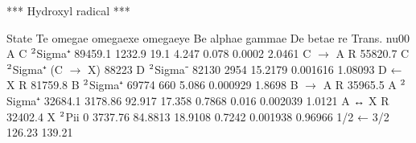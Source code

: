 \documentclass[letterpaper,10pt,english]{sphinxmanual}
\begin{document}
\begin{sphinxVerbatim}[commandchars=\\\{\}]
*** Hydroxyl radical ***

State          T\PYGZus{}e    omega\PYGZus{}e    omega\PYGZus{}ex\PYGZus{}e  omega\PYGZus{}ey\PYGZus{}e        B\PYGZus{}e    alpha\PYGZus{}e    gamma\PYGZus{}e       D\PYGZus{}e  beta\PYGZus{}e        r\PYGZus{}e  Trans.        nu\PYGZus{}00        A
\PYGZhy{}\PYGZhy{}\PYGZhy{}\PYGZhy{}\PYGZhy{}\PYGZhy{}\PYGZhy{}\PYGZhy{}\PYGZhy{}  \PYGZhy{}\PYGZhy{}\PYGZhy{}\PYGZhy{}\PYGZhy{}\PYGZhy{}\PYGZhy{}  \PYGZhy{}\PYGZhy{}\PYGZhy{}\PYGZhy{}\PYGZhy{}\PYGZhy{}\PYGZhy{}\PYGZhy{}\PYGZhy{}  \PYGZhy{}\PYGZhy{}\PYGZhy{}\PYGZhy{}\PYGZhy{}\PYGZhy{}\PYGZhy{}\PYGZhy{}\PYGZhy{}\PYGZhy{}\PYGZhy{}\PYGZhy{}  \PYGZhy{}\PYGZhy{}\PYGZhy{}\PYGZhy{}\PYGZhy{}\PYGZhy{}\PYGZhy{}\PYGZhy{}\PYGZhy{}\PYGZhy{}\PYGZhy{}\PYGZhy{}  \PYGZhy{}\PYGZhy{}\PYGZhy{}\PYGZhy{}\PYGZhy{}\PYGZhy{}\PYGZhy{}  \PYGZhy{}\PYGZhy{}\PYGZhy{}\PYGZhy{}\PYGZhy{}\PYGZhy{}\PYGZhy{}\PYGZhy{}\PYGZhy{}  \PYGZhy{}\PYGZhy{}\PYGZhy{}\PYGZhy{}\PYGZhy{}\PYGZhy{}\PYGZhy{}\PYGZhy{}\PYGZhy{}  \PYGZhy{}\PYGZhy{}\PYGZhy{}\PYGZhy{}\PYGZhy{}\PYGZhy{}\PYGZhy{}\PYGZhy{}  \PYGZhy{}\PYGZhy{}\PYGZhy{}\PYGZhy{}\PYGZhy{}\PYGZhy{}\PYGZhy{}\PYGZhy{}  \PYGZhy{}\PYGZhy{}\PYGZhy{}\PYGZhy{}\PYGZhy{}\PYGZhy{}\PYGZhy{}  \PYGZhy{}\PYGZhy{}\PYGZhy{}\PYGZhy{}\PYGZhy{}\PYGZhy{}\PYGZhy{}\PYGZhy{}\PYGZhy{}  \PYGZhy{}\PYGZhy{}\PYGZhy{}\PYGZhy{}\PYGZhy{}\PYGZhy{}\PYGZhy{}\PYGZhy{}  \PYGZhy{}\PYGZhy{}\PYGZhy{}\PYGZhy{}\PYGZhy{}\PYGZhy{}\PYGZhy{}
C \(\sp{\text{2}}\)Sigma⁺  89459.1    1232.9        19.1                    4.247      0.078              0.0002              2.0461   C \(\rightarrow\) A R    55820.7
C \(\sp{\text{2}}\)Sigma⁺                                                                                                              (C \(\rightarrow\) X)    88223
D \(\sp{\text{2}}\)Sigma⁻  82130      2954                                 15.2179                        0.001616            1.08093  D ← X R    81759.8
B \(\sp{\text{2}}\)Sigma⁺  69774       660                                  5.086                         0.000929            1.8698   B \(\rightarrow\) A R    35965.5
A \(\sp{\text{2}}\)Sigma⁺  32684.1    3178.86       92.917                 17.358      0.7868     \PYGZhy{}0.016  0.002039            1.0121   A ↔ X R    32402.4
X \(\sp{\text{2}}\)Pi\PYGZus{}i        0      3737.76       84.8813                18.9108     0.7242             0.001938            0.96966  1/2 ← 3/2    126.23  \PYGZhy{}139.21
\end{sphinxVerbatim}
\end{document}
